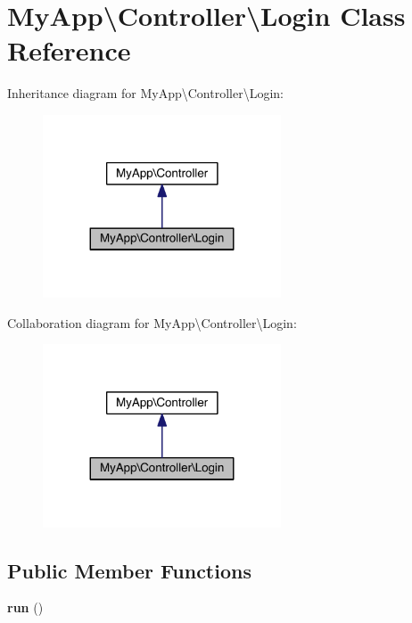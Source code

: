 \hypertarget{class_my_app_1_1_controller_1_1_login}{}\section{My\+App\textbackslash{}Controller\textbackslash{}Login Class Reference}
\label{class_my_app_1_1_controller_1_1_login}


Inheritance diagram for My\+App\textbackslash{}Controller\textbackslash{}Login\+:
\nopagebreak
\begin{figure}[H]
\begin{center}
\leavevmode
\includegraphics[width=200pt]{class_my_app_1_1_controller_1_1_login__inherit__graph}
\end{center}
\end{figure}


Collaboration diagram for My\+App\textbackslash{}Controller\textbackslash{}Login\+:
\nopagebreak
\begin{figure}[H]
\begin{center}
\leavevmode
\includegraphics[width=200pt]{class_my_app_1_1_controller_1_1_login__coll__graph}
\end{center}
\end{figure}
\subsection*{Public Member Functions}
\begin{DoxyCompactItemize}
\item 
{\bfseries run} ()\hypertarget{class_my_app_1_1_controller_1_1_login_aa0bc28e2af0d0d3aaa9231e18744b8ce}{}\label{class_my_app_1_1_controller_1_1_login_aa0bc28e2af0d0d3aaa9231e18744b8ce}

\end{DoxyCompactItemize}
